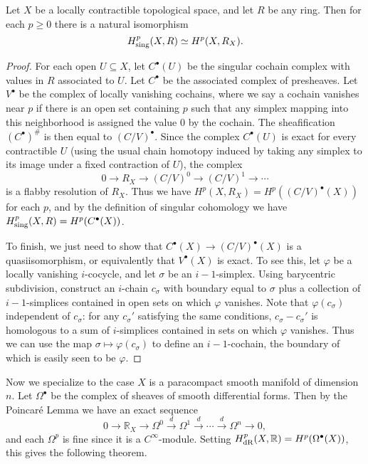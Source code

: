 \begin{thm} Let $X$ be a locally contractible topological space, and let $R$ be any ring. Then for each $p \ge 0$ there is a natural isomorphism
\[
H^p_{\rm sing}(X,R) \simeq H^p(X,R_X).
\]
\end{thm}
\begin{proof} For each open $U\subseteq X$, let $C^\bullet(U)$ be the singular cochain complex with values in $R$ associated to $U$. Let $C^\bullet$ be the associated complex of presheaves. Let $V^\bullet$ be the complex of locally vanishing cochains, where we say a cochain vanishes near $p$ if there is an open set containing $p$ such that any simplex mapping into this neighborhood is assigned the value $0$ by the cochain. The sheafification $(C^\bullet)^\#$ is then equal to $(C/V)^\bullet$. Since the complex $C^\bullet(U)$ is exact for every contractible $U$ (using the usual chain homotopy induced by taking any simplex to its image under a fixed contraction of $U$), the complex
\[
0 \rightarrow R_X \rightarrow (C/V)^0 \rightarrow (C/V)^1 \rightarrow \cdots
\]
is a flabby resolution of $R_X$. Thus we have $H^p(X,R_X) = H^p((C/V)^\bullet(X))$ for each $p$, and by the definition of singular cohomology we have $H^p_{\rm sing}(X,R) = H^p(C^\bullet(X))$.

To finish, we just need to show that $C^\bullet(X) \rightarrow (C/V)^\bullet(X)$ is a quasiisomorphism, or equivalently that $V^\bullet(X)$ is exact. To see this, let $\varphi$ be a locally vanishing $i$-cocycle, and let $\sigma$ be an $i-1$-simplex. Using barycentric subdivision, construct an $i$-chain $c_\sigma$ with boundary equal to $\sigma$ plus a collection of $i-1$-simplices contained in open sets on which $\varphi$ vanishes. Note that $\varphi(c_\sigma)$ independent of $c_\sigma$: for any $c_\sigma'$ satisfying the same conditions, $c_\sigma-c_\sigma'$ is homologous to a sum of $i$-simplices contained in sets on which $\varphi$ vanishes. Thus we can use the map $\sigma \mapsto \varphi(c_\sigma)$ to define an $i-1$-cochain, the boundary of which is easily seen to be $\varphi$.
\end{proof}

Now we specialize to the case $X$ is a paracompact smooth manifold of dimension $n$. Let $\Omega^\bullet$ be the complex of sheaves of smooth differential forms. Then by the Poincar\'{e} Lemma we have an exact sequence
\[
0 \rightarrow \mathbb{R}_X \rightarrow \Omega^0 \stackrel{d}{\rightarrow} \Omega^1 \stackrel{d}{\rightarrow} \cdots \stackrel{d}{\rightarrow} \Omega^n \rightarrow 0,
\]
and each $\Omega^p$ is fine since it is a $C^\infty$-module. Setting $H^p_{\rm dR}(X,\mathbb{R}) = H^p(\Omega^\bullet(X))$, this gives the following theorem.

